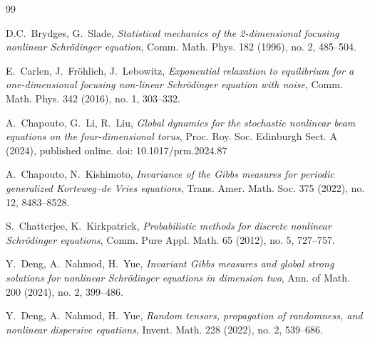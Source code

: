 \documentclass[letterpaper, 11pt,  reqno]{amsart}
\numberwithin{equation}{section}
\numberwithin{theorem}{section}
\begin{document}
\begin{thebibliography}{99}
	
%	
				
D.C.~Brydges, G.~Slade, 
{\it Statistical mechanics of the 2-dimensional focusing nonlinear Schr\"odinger equation},
Comm. Math. Phys. 182 (1996), no. 2, 485--504.	
	
	

E.~Carlen, J.~Fr\"ohlich, J.~Lebowitz, 
{\it Exponential relaxation to equilibrium for a one-dimensional focusing non-linear Schr\"odinger equation with noise},
Comm. Math. Phys. 342 (2016), no. 1, 303--332. 



A.~Chapouto, G.~Li, R.~Liu,
{\it  Global dynamics for the stochastic nonlinear beam equations on the four-dimensional torus},
 Proc. Roy. Soc. Edinburgh Sect. A
 (2024), 
published online.  doi: 10.1017/prm.2024.87 	

A.~Chapouto, N.~Kishimoto, 
{\it Invariance of the Gibbs measures for periodic generalized Korteweg--de Vries equations},  Trans. Amer. Math. Soc. 375 (2022), no. 12, 8483--8528.
	
	
S.~Chatterjee, K.~Kirkpatrick, 
{\it Probabilistic methods for discrete nonlinear Schr\"odinger equations},
Comm. Pure Appl. Math. 65 (2012), no. 5, 727--757.	
	
	

	
	



Y.~Deng, A.~Nahmod, H.~Yue,
{\it 
Invariant Gibbs measures and global strong solutions for nonlinear Schr\"odinger equations in dimension two},
  Ann. of Math.  200 (2024), no. 2, 399--486. 


	
	
Y.~Deng, A.~Nahmod,  H.~Yue,
{\it Random tensors, propagation of randomness, and
nonlinear dispersive equations}, Invent.
Math. 228 (2022), no. 2, 539--686.



\end{thebibliography}
\end{document}
